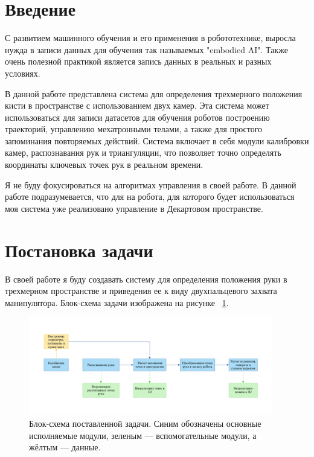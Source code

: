 \documentclass[12pt, a4paper]{article}
\begin{document}
\onehalfspacing



\section{Введение}
С развитием машинного обучения и его применения в робототехнике, выросла
нужда в записи данных для обучения так называемых "embodied AI". Также
очень полезной практикой является запись данных в реальных и разных
условиях.

В данной работе представлена система для определения трехмерного
положения кисти в пространстве с использованием двух камер. Эта система
может использоваться для записи датасетов для обучения роботов построению
траекторий, управлению мехатронными телами, а также для простого
запоминания повторяемых действий. Система включает в себя модули
калибровки камер, распознавания рук и триангуляции, что позволяет точно
определять координаты ключевых точек рук в реальном времени. 

Я не буду фокусироваться на алгоритмах управления в своей работе. В данной
работе подразумевается, что для на робота, для которого будет использоваться моя
система уже реализовано управление в Декартовом пространстве.

\section{Постановка задачи}
В своей работе я буду создавать систему для определения положения руки в
трехмерном пространстве и приведения ее к виду двухпальцевого захвата
манипулятора.
Блок-схема задачи изображена на рисунке ~\ref{fig:problem_block_scheme}. 
\begin{figure}[h!]
  \begin{center}
    \includegraphics[width=0.95\textwidth]{images/block-schemes/problem_scheme.png}
  \end{center}
  \caption{
    Блок-схема поставленной задачи. Синим обозначены основные
    исполняемые модули, зеленым --- вспомогательные модули, а жёлтым ---
    данные.
  }
\label{fig:problem_block_scheme}
\end{figure}
\end{document}
